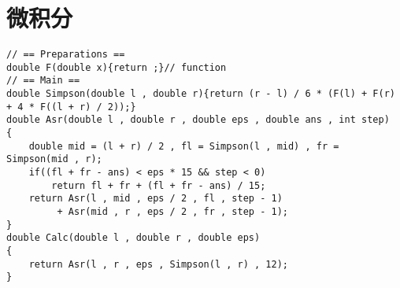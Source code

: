\section{微积分}

\begin{verbatim}
// == Preparations ==
double F(double x){return ;}// function
// == Main ==
double Simpson(double l , double r){return (r - l) / 6 * (F(l) + F(r) + 4 * F((l + r) / 2));}
double Asr(double l , double r , double eps , double ans , int step)
{
    double mid = (l + r) / 2 , fl = Simpson(l , mid) , fr = Simpson(mid , r);
    if((fl + fr - ans) < eps * 15 && step < 0)
        return fl + fr + (fl + fr - ans) / 15;
    return Asr(l , mid , eps / 2 , fl , step - 1) 
         + Asr(mid , r , eps / 2 , fr , step - 1);
}
double Calc(double l , double r , double eps)
{
    return Asr(l , r , eps , Simpson(l , r) , 12);
}
\end{verbatim}